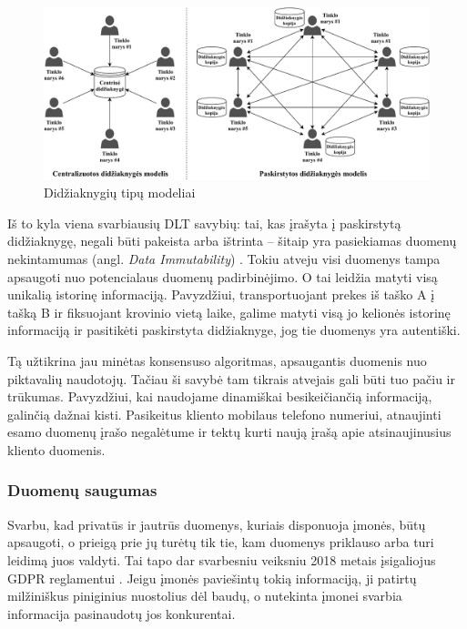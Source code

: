 \begin{figure}[H]
    \centering
    \includegraphics[scale=0.65]{images/ledger-model-types}
    \caption{Didžiaknygių tipų modeliai}
\end{figure}

Iš to kyla viena svarbiausių DLT savybių: tai, kas įrašyta į paskirstytą didžiaknygę, negali būti pakeista arba ištrinta – šitaip yra pasiekiamas duomenų nekintamumas (angl. \textit{Data Immutability}) \cite{xu2017dl}. Tokiu atveju visi duomenys tampa apsaugoti nuo potencialaus duomenų padirbinėjimo. O tai leidžia matyti visą unikalią istorinę informaciją. Pavyzdžiui, transportuojant prekes iš taško A į tašką B ir fiksuojant krovinio vietą laike, galime matyti visą jo kelionės istorinę informaciją ir pasitikėti paskirstyta didžiaknyge, jog tie duomenys yra autentiški. 

Tą užtikrina jau minėtas konsensuso algoritmas, apsaugantis duomenis nuo piktavalių naudotojų. Tačiau ši savybė tam tikrais atvejais gali būti tuo pačiu ir trūkumas. Pavyzdžiui, kai naudojame dinamiškai besikeičiančią informaciją, galinčią dažnai kisti. Pasikeitus kliento mobilaus telefono numeriui, atnaujinti esamo duomenų įrašo negalėtume ir tektų kurti naują įrašą apie atsinaujinusius kliento duomenis.




\subsubsection{Duomenų saugumas}

Svarbu, kad privatūs ir jautrūs duomenys, kuriais disponuoja įmonės, būtų apsaugoti, o prieigą prie jų turėtų tik tie, kam duomenys priklauso arba turi leidimą juos valdyti. Tai tapo dar svarbesniu veiksniu 2018 metais įsigaliojus GDPR reglamentui \cite{ferrari2018eu}. Jeigu įmonės paviešintų tokią informaciją, ji patirtų milžiniškus piniginius nuostolius dėl baudų, o nutekinta įmonei svarbia informacija pasinaudotų jos konkurentai.

